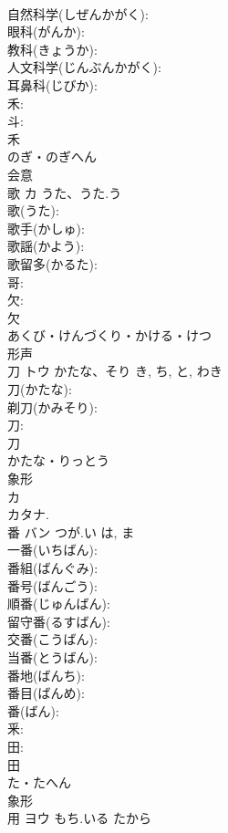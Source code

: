 \documentclass[8pt]{extreport}
\begin{document}
\begin{CJK}{UTF8}{min}
\\	自然科学(しぜんかがく): 
\\	眼科(がんか): 
\\	教科(きょうか): 
\\	人文科学(じんぶんかがく): 
\\	耳鼻科(じびか): 
\\	禾: 
\\	斗: 
\\	禾	
\\	のぎ・のぎへん	
\\	会意 
\\	歌	カ	うた、うた.う		
\\	歌(うた): 
\\	歌手(かしゅ): 
\\	歌謡(かよう): 
\\	歌留多(かるた): 
\\	哥: 
\\	欠: 
\\	欠	
\\	あくび・けんづくり・かける・けつ	
\\	形声 
\\	刀	トウ	かたな、そり	き, ち, と, わき	
\\	刀(かたな): 
\\	剃刀(かみそり): 
\\	刀: 
\\	刀	
\\	かたな・りっとう	
\\	象形 
\\	カ 
\\	カタナ.	
\\	番	バン	つが.い	は, ま	
\\	一番(いちばん): 
\\	番組(ばんぐみ): 
\\	番号(ばんごう): 
\\	順番(じゅんばん): 
\\	留守番(るすばん): 
\\	交番(こうばん): 
\\	当番(とうばん): 
\\	番地(ばんち): 
\\	番目(ばんめ): 
\\	番(ばん): 
\\	釆: 
\\	田: 
\\	田	
\\	た・たへん	
\\	象形 
\\	用	ヨウ	もち.いる	たから	

\end{CJK}
\end{document}
